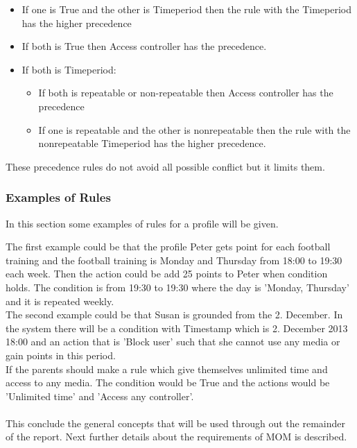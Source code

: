 \begin{itemize}
	\item If one is True and the other is Timeperiod then the rule with the Timeperiod has the higher precedence
	\item If both is True then Access controller has the precedence.
	\item If both is Timeperiod:
		\begin{itemize}
			\item If both is repeatable or non-repeatable then Access controller has the precedence
			\item If one is repeatable and the other is nonrepeatable then the rule with the nonrepeatable Timeperiod has the higher precedence.
		\end{itemize}
\end{itemize}

These precedence rules do not avoid all possible conflict but it limits them.  
	
\subsubsection{Examples of Rules}
In this section some examples of rules for a profile will be given.

The first example could be that the profile Peter gets point for each football training and the football training is Monday and Thursday from 18:00 to 19:30 each week. Then the action could be add 25 points to Peter when condition holds. The condition is from 19:30 to 19:30 where the day is 'Monday, Thursday' and it is repeated weekly. \\

The second example could be that Susan is grounded from the 2. December. In the system there will be a condition with Timestamp which is 2. December 2013 18:00
and an action that is 'Block user' such that she cannot use any media or gain points in this period. \\

If the parents should make a rule which give themselves unlimited time and access to any media. The condition would be True and the actions would be 'Unlimited time' and 'Access any controller'.\\\\

This conclude the general concepts that will be used through out the remainder of the report. Next further details about the requirements of MOM is described.  


